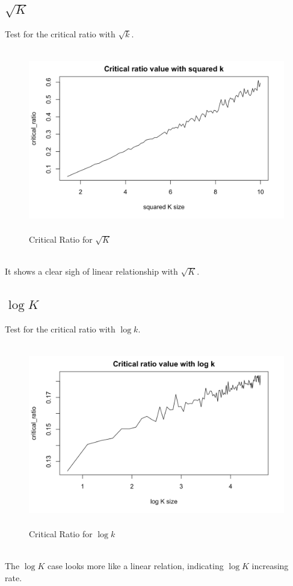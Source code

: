 \documentclass[english]{article}\usepackage{graphicx, color}
\numberwithin{equation}{section}
\numberwithin{figure}{section}
\begin{document}
\quad\\
\quad\\
\quad\\
\quad\\
\quad\\
\quad\\
\quad\\
\quad\\
\quad\\
\quad\\
\subsection{$\sqrt{K}$}
Test for the critical ratio with $\sqrt{k}$.
\begin{figure}[htbp]
\centering\includegraphics[width=4.5in,height=3.15in]{sqrt}
\caption{Critical Ratio for $\sqrt{K}$}
\end{figure}
\quad\\
It shows a clear sigh of linear relationship with $\sqrt{K}$.

\subsection{$\log{K}$}
Test for the critical ratio with $\log{k}$.
\begin{figure}[htbp]
\centering\includegraphics[width=4.8in,height=3.15in]{log}
\caption{Critical Ratio for $\log{k}$}
\end{figure}
\quad\\
The $\log{K}$ case looks more like a linear relation, indicating $\log{K}$ increasing rate.
\end{document}
